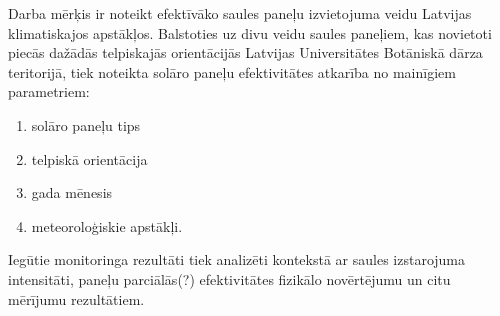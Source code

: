 Darba mērķis ir noteikt efektīvāko saules paneļu izvietojuma veidu Latvijas klimatiskajos apstākļos. 
Balstoties uz divu veidu saules paneļiem, kas novietoti piecās dažādās telpiskajās orientācijās Latvijas Universitātes Botāniskā dārza teritorijā, tiek noteikta solāro paneļu efektivitātes atkarība no mainīgiem parametriem:
\begin{enumerate}
\item solāro paneļu tips
\item telpiskā orientācija
\item gada mēnesis
\item meteoroloģiskie apstākļi.
\end{enumerate}

Iegūtie monitoringa rezultāti tiek analizēti kontekstā ar saules izstarojuma intensitāti, paneļu parciālās(?) efektivitātes fizikālo novērtējumu un citu mērījumu rezultātiem.\\

